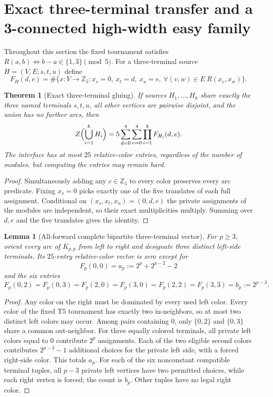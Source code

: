 \documentclass[11pt]{article}
\newtheorem{theorem}{Theorem}
\newtheorem{lemma}{Lemma}
\begin{document}
\section{Exact three-terminal transfer and a 3-connected high-width easy family}
\label{sec:tmr3-three-terminal-092}
Throughout this section the fixed tournament satisfies
$R(a,b)\iff b-a\in\{1,3\}\pmod5$. For a three-terminal source
$H=(V,E;s,t,u)$ define
\[
F_H(d,e)=\#\{x:V\to\mathbb Z_5:
 x_s=0,\ x_t=d,\ x_u=e,\ \forall(v,w)\in E\ R(x_v,x_w)\}.
\]
\begin{theorem}[Exact three-terminal gluing]
If sources $H_1,\ldots,H_k$ share exactly the three named terminals
$s,t,u$, all other vertices are pairwise disjoint, and the union has
no further arcs, then
\[
Z\Bigl(\bigcup_{i=1}^k H_i\Bigr)=
5\sum_{d=0}^4\sum_{e=0}^4\prod_{i=1}^kF_{H_i}(d,e).
\]
The interface has at most $25$ relative-color entries, regardless of
the number of modules, but computing the entries may remain hard.
\end{theorem}
\begin{proof}
Simultaneously adding any $c\in\mathbb Z_5$ to every color
preserves every arc predicate. Fixing $x_s=0$ picks exactly one of
the five translates of each full assignment. Conditional on
$(x_s,x_t,x_u)=(0,d,e)$ the private assignments of the modules
are independent, so their exact multiplicities multiply.
Summing over $d,e$ and the five translates gives the identity.
\end{proof}

\begin{lemma}[All-forward complete bipartite three-terminal vector]
For $p\ge3$, orient every arc of $K_{p,p}$ from left to right and
designate three distinct left-side terminals. Its $25$-entry
relative-color vector is zero except for
\[
F_p(0,0)=a_p:=2^p+2^{p-2}-2
\]
and the six entries
\[
F_p(0,2)=F_p(0,3)=F_p(2,0)=F_p(3,0)
=F_p(2,2)=F_p(3,3)=b_p:=2^{p-3}.
\]
\end{lemma}
\begin{proof}
Any color on the right must be dominated by every used left
color. Every color of the fixed T5 tournament has exactly two
in-neighbors, so at most two distinct left colors may occur.
Among pairs containing $0$, only $\{0,2\}$ and $\{0,3\}$ share
a common out-neighbor. For three equally colored terminals,
all private left colors equal to $0$ contribute $2^p$ assignments.
Each of the two eligible second colors contributes
$2^{p-3}-1$ additional choices for the private left side,
with a forced right-side color. This totals $a_p$.
For each of the six nonconstant compatible terminal tuples,
all $p-3$ private left vertices have two permitted choices,
while each right vertex is forced; the count is $b_p$.
Other tuples have no legal right color.
\end{proof}
\end{document}
